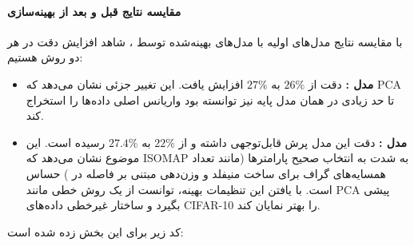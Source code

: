 \documentclass{article}
\begin{document}
\paragraph{مقایسه نتایج قبل و بعد از بهینه‌سازی}
با مقایسه نتایج مدل‌های اولیه با مدل‌های بهینه‌شده توسط ، شاهد افزایش دقت در هر دو روش هستیم:
\begin{itemize}
	\item \textbf{مدل :} دقت از $26\%$ به $27\%$ افزایش یافت. این تغییر جزئی نشان می‌دهد که PCA تا حد زیادی در همان مدل پایه نیز توانسته بود واریانس اصلی داده‌ها را استخراج کند.
	\item \textbf{مدل :} دقت این مدل پرش قابل‌توجهی داشته و از $22\%$ به $27.4\%$ رسیده است. این موضوع نشان می‌دهد که ISOMAP به شدت به انتخاب صحیح پارامترها (مانند تعداد همسایه‌های گراف برای ساخت منیفلد و وزن‌دهی مبتنی بر فاصله در ) حساس است. با یافتن این تنظیمات بهینه،  توانست از یک روش خطی مانند PCA پیشی بگیرد و ساختار غیرخطی داده‌های CIFAR-10 را بهتر نمایان کند.
\end{itemize}
کد زیر برای این بخش زده شده است:
\end{document}
